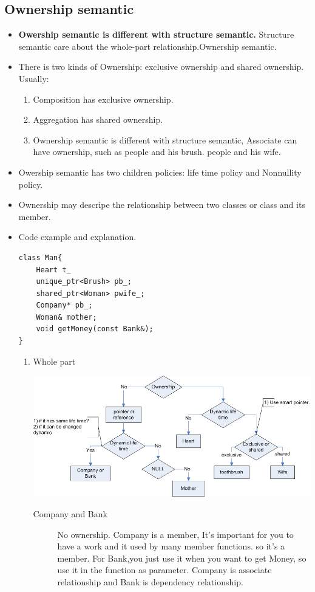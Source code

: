 \documentclass[a4paper,11pt,twoside]{book}
\begin{document}
\subsection{Ownership semantic}
\begin{itemize}
	\item \textbf{Owership semantic is different with structure semantic.} Structure semantic care about the whole-part relationship.Ownership semantic. 
	
	\item There is two kinds of Ownership: exclusive ownership and shared ownership. Usually:
	\begin{enumerate}
		\item Composition has exclusive ownership.
		\item Aggregation has shared ownership.
		\item Ownership semantic is different with structure semantic, Associate can have ownership, such as people and his brush. people and his wife.
	\end{enumerate}
	
	\item Owership semantic has two children policies: life time policy and Nonnullity policy. 
	
	\item Ownership may descripe the relationship between two classes or class and its member.
	
	\item Code example and explanation. 
\begin{lstlisting}
class Man{
	Heart t_   
	unique_ptr<Brush> pb_; 
	shared_ptr<Woman> pwife_; 
	Company* pb_; 
	Woman& mother; 
	void getMoney(const Bank&);
}
\end{lstlisting}
\begin{enumerate}
\item Whole part

	\centering
	\includegraphics[width=0.9\linewidth]{pics/owner.png}

\begin{description}
	\item[Company and Bank] No ownership. Company is a member, It's important for you to have a work and it used by many member functions. so it's a member. For Bank,you just use it when you want to get Money, so use it in the function as parameter. Company is associate relationship and Bank is dependency relationship.
	

\end{description}
\end{enumerate}
\end{itemize}
\end{document}

